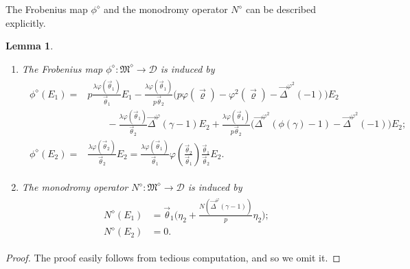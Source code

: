 \documentclass[11pt]{amsart}
\theoremstyle{definition}
\numberwithin{equation}{subsection}
\theoremstyle{plain}
\theoremstyle{plain}
\theoremstyle{plain}
\theoremstyle{plain}
\theoremstyle{plain}
\theoremstyle{plain}
\theoremstyle{plain}
\theoremstyle{plain}
\theoremstyle{plain}
\newtheorem{lemm}[equation]{Lemma}
\theoremstyle{plain}
\theoremstyle{plain}
\theoremstyle{plain}
\theoremstyle{definition}
\theoremstyle{definition}
\theoremstyle{definition}
\theoremstyle{remark}
\renewcommand{\(}{\textup{(}}
\renewcommand{\)}{\textup{)}}
\newcommand{\fM}{\mathfrak{M}}
\newcommand{\cD}{\mathcal{D}}
\newcommand{\vth}{\vec{\theta}}
\newcommand{\vrho}{\vec{\varrho}}
\newcommand{\vDel}{\vec{\Delta}}
\begin{document}
The Frobenius map $\phi^\diamond$ and the monodromy operator $N^\diamond$ can be described explicitly.
\begin{lemm}\label{lemm: computation of phi^diamond N^diamond}
\begin{enumerate}[leftmargin=*]
\item The Frobenius map $\phi^\diamond:\fM^\diamond\rightarrow\cD$ is induced by
\begin{align}\label{eq: computation of phi}
\begin{split}
\phi^\diamond(E_1)=&
    p\frac{\lambda\varphi(\vth_1)}{\vth_1}E_1
    -\frac{\lambda\varphi(\vth_1)}{p\vth_2} \big(p\varphi(\vrho)-\varphi^2(\vrho)-\vDel^{\varphi^2}(-1)\big)E_2\\
    &\qquad-\frac{\lambda\varphi(\vth_1)}{\vth_2}\vDel^\varphi(\gamma-1)E_2  +\frac{\lambda\varphi(\vth_1)}{p\vth_2}\big(
    \vDel^{\varphi^2}(\phi(\gamma)-1)-\vDel^{\varphi^2}(-1)\big)E_2;\\
\phi^\diamond(E_2)=&\frac{\lambda\varphi(\vth_2)}{\vth_2}E_2 =\frac{\lambda\varphi(\vth_1)}{\vth_1}\varphi\left(\frac{\vth_2}{\vth_1}\right)\frac{\vth_1}{\vth_2}E_2.
\end{split}
\end{align}
\item The monodromy operator $N^\diamond:\fM^\diamond\rightarrow\cD$ is induced by
\begin{align}\label{eq: computation of N}
\begin{split}
N^\diamond(E_1) &=\vth_1\bigg(\eta_2+\frac{N(\vDel^\varphi(\gamma-1))}{p}\eta_2\bigg);\\
N^\diamond(E_2) &=0.
\end{split}
\end{align}
\end{enumerate}
\end{lemm}

\begin{proof}
The proof easily follows from tedious computation, and so we omit it.
\end{proof}
\end{document}
